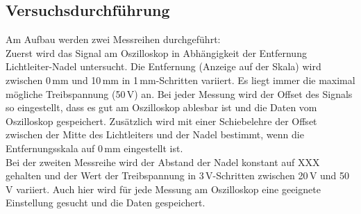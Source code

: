 \subsection{Versuchsdurchführung}

Am Aufbau werden zwei Messreihen durchgeführt:\\
Zuerst wird das Signal am Oszilloskop in Abhängigkeit der Entfernung Lichtleiter-Nadel untersucht.
Die Entfernung (Anzeige auf der Skala) wird zwischen 0\,mm und 10\,mm in 1\,mm-Schritten variiert.
Es liegt immer die maximal mögliche Treibspannung (50\,V) an.
Bei jeder Messung wird der Offset des Signals so eingestellt,
dass es gut am Oszilloskop ablesbar ist und die Daten vom Oszilloskop gespeichert.
Zusätzlich wird mit einer Schiebelehre der Offset zwischen der Mitte des Lichtleiters und der Nadel bestimmt,
wenn die Entfernungsskala auf 0\,mm eingestellt ist.\\
Bei der zweiten Messreihe wird der Abstand der Nadel konstant auf XXX
gehalten und der Wert der Treibspannung in 3\,V-Schritten zwischen 20\,V und 50\,V variiert.
Auch hier wird für jede Messung am Oszilloskop eine geeignete Einstellung gesucht und die Daten gespeichert.